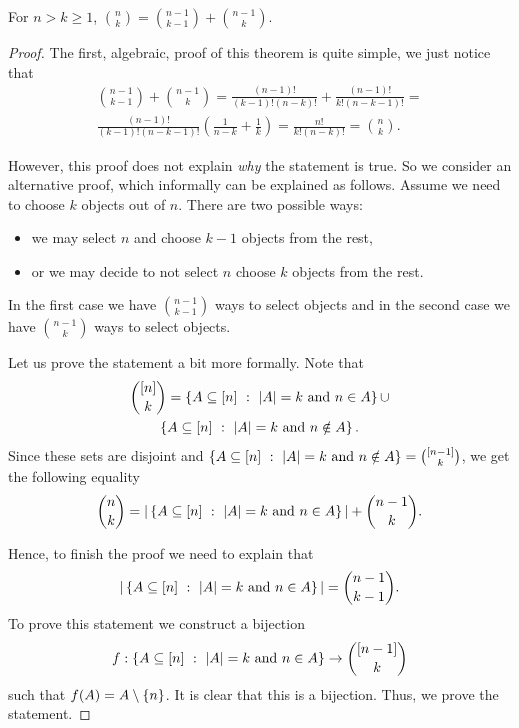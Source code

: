 \begin{theorem}
  For $n > k \ge 1$, $\binom{n}{k} = \binom{n - 1}{k - 1} + \binom{n - 1}{k}$.
\end{theorem}
\begin{proof}
  The first, algebraic, proof of this theorem is quite simple, we just notice
  that
  \begin{multline*}
    \binom{n - 1}{k - 1} + \binom{n - 1}{k} =
      \frac{(n - 1)!}{(k - 1)!(n - k)!} + \frac{(n - 1)!}{k!(n - k - 1)!} = \\
      \frac{(n - 1)!}{(k - 1)! (n - k - 1)!}
        \left(
          \frac{1}{n - k} + \frac{1}{k}
        \right) = \frac{n!}{k! (n - k)!} = \binom{n}{k}.
  \end{multline*}

  However, this proof does not explain \emph{why} the statement is true.
  So we consider an alternative proof, which informally can be explained as
  follows. Assume we need to choose $k$ objects out of $n$. There are two
  possible ways:
  \begin{itemize}
    \item we may select $n$ and choose $k - 1$ objects from the rest,
    \item or we may decide to not select $n$ choose $k$ objects from the rest.
  \end{itemize}
  In the first case we have $\binom{n - 1}{k - 1}$ ways to select objects and
  in the second case we have $\binom{n - 1}{k}$ ways to select objects.

  Let us prove the statement a bit more formally. Note that
  \begin{multline*}
    \binom{[n]}{k} = \set[|A| = k \text{ and } n \in A]{A \subseteq [n]} \cup \\
    \set[|A| = k \text{ and } n \notin A]{A \subseteq [n]}.
  \end{multline*}
  Since these sets are disjoint and $\set[|A| = k \text{ and } n \notin A]{A
  \subseteq [n]} = \binom{[n - 1]}{k}$, we get the following equality
  \[
    \binom{n}{k} = |\set[|A| = k \text{ and } n \in A]{A \subseteq [n]}| +
    \binom{n - 1}{k}.
  \]

  Hence, to finish the proof we need to explain that
  \[
    |\set[|A| = k \text{ and } n \in A]{A \subseteq [n]}| =
    \binom{n - 1}{k - 1}.
  \]
  To prove this statement we construct a bijection
  \[
    f : \set[|A| = k \text{ and } n \in A]{A \subseteq [n]} \to
      \binom{[n - 1]}{k}
  \]
  such that $f(A) = A \setminus \set{n}$.
  It is clear that this is a bijection. Thus, we prove the statement.
\end{proof}

